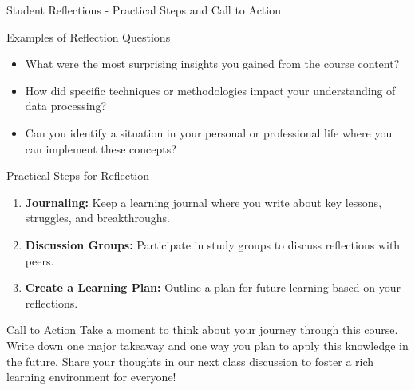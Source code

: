 \documentclass[aspectratio=169]{beamer}
\begin{document}
\begin{frame}[fragile]{Student Reflections - Practical Steps and Call to Action}
    \begin{block}{Examples of Reflection Questions}
        \begin{itemize}
            \item What were the most surprising insights you gained from the course content?
            \item How did specific techniques or methodologies impact your understanding of data processing?
            \item Can you identify a situation in your personal or professional life where you can implement these concepts?
        \end{itemize}
    \end{block}
    
    \begin{block}{Practical Steps for Reflection}
        \begin{enumerate}
            \item \textbf{Journaling:} Keep a learning journal where you write about key lessons, struggles, and breakthroughs.
            \item \textbf{Discussion Groups:} Participate in study groups to discuss reflections with peers.
            \item \textbf{Create a Learning Plan:} Outline a plan for future learning based on your reflections.
        \end{enumerate}
    \end{block}
    
    \begin{block}{Call to Action}
        Take a moment to think about your journey through this course. Write down one major takeaway and one way you plan to apply this knowledge in the future. Share your thoughts in our next class discussion to foster a rich learning environment for everyone!
    \end{block}
\end{frame}
\end{document}
